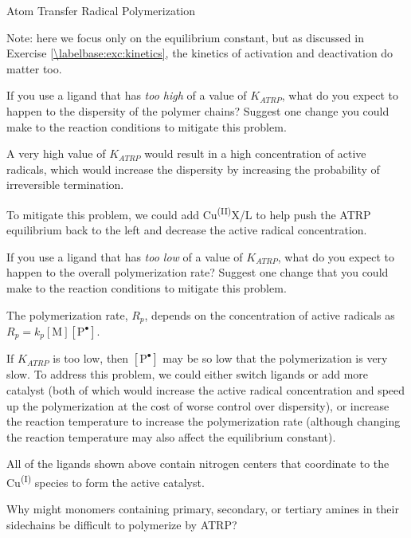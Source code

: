 \begin{activity}{Atom Transfer Radical Polymerization}
\begin{ctqs}
\begin{solution}[1.25in]{}
		Note: here we focus only on the equilibrium constant, but as discussed in Exercise \ref{\labelbase:exc:kinetics}, the kinetics of activation and deactivation do matter too.
		\end{solution}
	
	\question If you use a ligand that has \emph{too high} of a value of $K_{ATRP}$, what do you expect to happen to the dispersity of the polymer chains?  Suggest one change you could make to the reaction conditions to mitigate this problem.
	
		\begin{solution}[1.25in]{}
			A very high value of $K_{ATRP}$ would result in a high concentration of active radicals, which would increase the dispersity by increasing the probability of irreversible termination.
			
			To mitigate this problem, we could add Cu\textsuperscript{(II)}X/L to help push the ATRP equilibrium back to the left and decrease the active radical concentration.
		\end{solution}
	
	\question If you use a ligand that has \emph{too low} of a value of $K_{ATRP}$, what do you expect to happen to the overall polymerization rate?  Suggest one change that you could make to the reaction conditions to mitigate this problem. \label{\labelbase:ctq:lowK}
	
		\begin{solution}[1.25in]{}
			The polymerization rate, $R_p$, depends on the concentration of active radicals as $R_p = k_p[\text{M}][\text{P}^\bullet]$.
			
			If $K_{ATRP}$ is too low, then $[\text{P}^\bullet]$ may be so low that the polymerization is very slow.  To address this problem, we could either switch ligands or add more catalyst (both of which would increase the active radical concentration and speed up the polymerization at the cost of worse control over dispersity), or increase the reaction temperature to increase the polymerization rate (although changing the reaction temperature may also affect the equilibrium constant).
		\end{solution}
	
	\question All of the ligands shown above contain nitrogen centers that coordinate to the Cu\textsuperscript{(I)} species to form the active catalyst.
	
		Why might monomers containing primary, secondary, or tertiary amines in their sidechains be difficult to polymerize by ATRP?  
	

\end{ctqs}
\end{activity}
